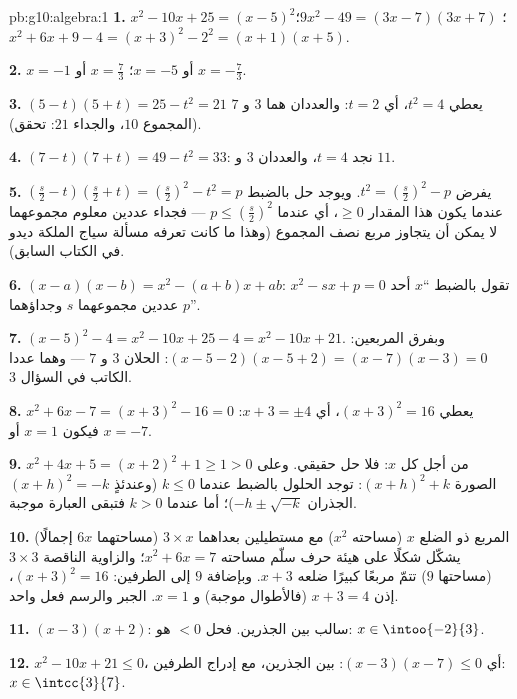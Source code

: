 \begin{solution}{pb:g10:algebra:1}
\textbf{1.} $x^2 - 10x + 25 = (x - 5)^2$؛
$9x^2 - 49 = (3x - 7)(3x + 7)$؛
$x^2 + 6x + 9 - 4 = (x + 3)^2 - 2^2 = (x + 1)(x + 5)$.

\textbf{2.} $x = -1$ أو $x = -5$؛ \quad $x = \frac73$ أو
$x = -\frac73$.

\textbf{3.} $(5 - t)(5 + t) = 25 - t^2 = 21$ يعطي $t^2 = 4$، أي
$t = 2$: والعددان هما $3$ و $7$ (المجموع $10$، والجداء $21$:
تحقق).

\textbf{4.} $(7 - t)(7 + t) = 49 - t^2 = 33$: نجد $t = 4$، والعددان
$3$ و $11$.

\textbf{5.} $\left(\frac s2 - t\right)\left(\frac s2 + t\right)
= \left(\frac s2\right)^2 - t^2 = p$ يفرض
$t^2 = \left(\frac s2\right)^2 - p$. ويوجد حل بالضبط
عندما يكون هذا المقدار $\geq 0$، أي عندما
$p \leq \left(\frac s2\right)^2$ --- فجداء عددين
معلوم مجموعهما لا يمكن أن يتجاوز مربع نصف المجموع
(وهذا ما كانت تعرفه مسألة سياج الملكة ديدو في الكتاب السابق).

\textbf{6.} $(x - a)(x - b) = x^2 - (a + b)x + ab$: 
$x^2 - sx + p = 0$ تقول بالضبط ``$x$ أحد عددين
مجموعهما $s$ وجداؤهما $p$''.

\textbf{7.} $(x-5)^2 - 4 = x^2 - 10x + 25 - 4 = x^2 - 10x +
21$. وبفرق المربعين:
$(x - 5 - 2)(x - 5 + 2) = (x - 7)(x - 3) = 0$: الحلان $3$
و $7$ --- وهما عددا الكاتب في السؤال 3.

\textbf{8.} $x^2 + 6x - 7 = (x + 3)^2 - 16 = 0$ يعطي
$(x + 3)^2 = 16$، أي $x + 3 = \pm 4$: فيكون $x = 1$ أو $x = -7$.

\textbf{9.} $x^2 + 4x + 5 = (x + 2)^2 + 1 \geq 1 > 0$ من أجل كل
$x$: فلا حل حقيقي. وعلى الصورة $(x + h)^2 + k$: توجد الحلول
بالضبط عندما $k \leq 0$ (وعندئذٍ  $(x+h)^2 = -k$ الجذران
$-h \pm \sqrt{-k}$)؛ أما عندما $k > 0$ فتبقى العبارة
موجبة.

\textbf{10.} المربع ذو الضلع $x$ (مساحته $x^2$) مع مستطيلين
بعداهما $3 \times x$ (مساحتهما $6x$ إجمالًا) يشكّل شكلًا على هيئة حرف
سلّم مساحته $x^2 + 6x = 7$؛ والزاوية الناقصة $3 \times 3$ (مساحتها $9$)
تتمّ مربعًا كبيرًا ضلعه $x + 3$. وبإضافة $9$ إلى
الطرفين: $(x + 3)^2 = 16$، إذن $x + 3 = 4$ (فالأطوال موجبة)
و $x = 1$. الجبر والرسم فعل واحد.

\textbf{11.} $(x-3)(x+2)$: سالب بين الجذرين. فحل
$< 0$ هو: $x \in \intoo{-2}{3}$.

\textbf{12.} $x^2 - 10x + 21 \leq 0$، أي
$(x - 3)(x - 7) \leq 0$: بين الجذرين، مع إدراج الطرفين:
$x \in \intcc{3}{7}$.


\end{solution}
